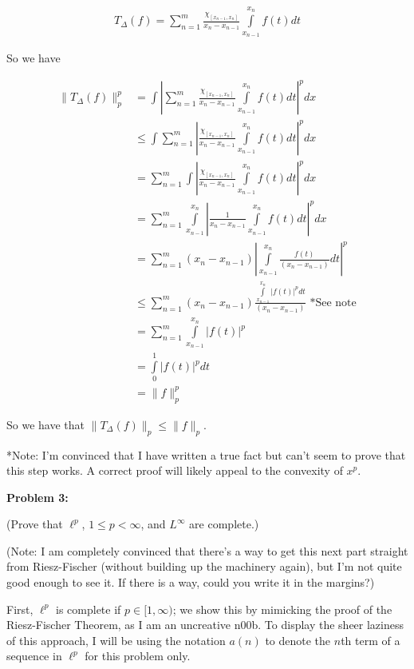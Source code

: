 \documentclass[a4paper,12pt]{article}
\newcommand{\shunt}{\vspace{20mm}}
\newcommand{\absval}[1]{\left\lvert #1 \right\rvert}
\newcommand{\norm}[1]{\|#1\|}
\newcommand{\De}{\Delta}
\begin{document}
\begin{align*}
T_\De(f) = \sum\limits_{n=1}^{m} \frac{\chi_{[x_{n-1},x_n]}}{x_n-x_{n-1}}\int\limits_{x_{n-1}}^{x_n} f(t)dt
\end{align*} 

So we have 

\begin{align*}
\norm{T_\De(f)}_p^p &= \int \absval{\sum\limits_{n=1}^{m} \frac{\chi_{[x_{n-1},x_n]}}{x_n-x_{n-1}}\int\limits_{x_{n-1}}^{x_n} f(t)dt}^pdx\\
&\leq \int \sum\limits_{n=1}^{m} \absval{ \frac{\chi_{[x_{n-1},x_n]}}{x_n-x_{n-1}}\int\limits_{x_{n-1}}^{x_n} f(t)dt}^pdx\\
&= \sum\limits_{n=1}^{m}\int  \absval{ \frac{\chi_{[x_{n-1},x_n]}}{x_n-x_{n-1}}\int\limits_{x_{n-1}}^{x_n} f(t)dt}^pdx\\
&= \sum\limits_{n=1}^{m}\int\limits_{x_{n-1}}^{x_n}  \absval{ \frac{1}{x_n-x_{n-1}}\int\limits_{x_{n-1}}^{x_n} f(t)dt}^pdx\\
&= \sum\limits_{n=1}^{m} (x_n-x_{n-1})\absval{ \int\limits_{x_{n-1}}^{x_n} \frac{f(t)}{(x_n-x_{n-1})}dt}^p\\
&\leq \sum\limits_{n=1}^{m} (x_n-x_{n-1})  \frac{\int\limits_{x_{n-1}}^{x_n}\absval{f(t)}^p dt}{(x_n-x_{n-1})} \text{ *See note}\\
&= \sum\limits_{n=1}^{m} \int\limits_{x_{n-1}}^{x_n}\absval{f(t)}^p \\
&= \int\limits_0^1 \absval{f(t)}^p dt \\
&= \norm{f}_p^p
\end{align*}

So we have that $\norm{T_\De(f)}_p \leq \norm{f}_p$. 

*Note: I'm convinced that I have written a true fact but can't seem to prove that this step works. A correct proof will likely appeal to the convexity of $x^p$.

\shunt

{\bf Problem 3:} 

(Prove that $\ell^p$, $1\leq p < \infty$, and $L^\infty$ are complete.)

(Note: I am completely convinced that there's a way to get this next part straight from Riesz-Fischer (without building up the machinery again), but I'm not quite good enough to see it. If there is a way, could you write it in the margins?)

First, $\ell^p$ is complete if $p \in [1, \infty)$; we show this by mimicking the proof of the Riesz-Fischer Theorem, as I am an uncreative n00b. To display the sheer laziness of this approach, I will be using the notation $a(n)$ to denote the $n$th term of a sequence in $\ell^p$ for this problem only.
\end{document}
